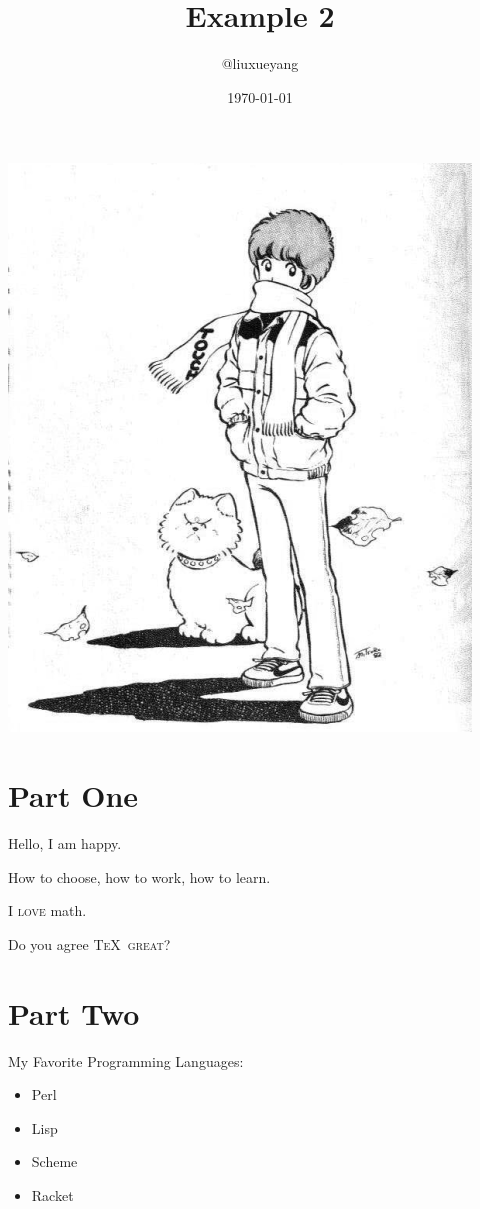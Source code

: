 \documentclass[a4paper, 11pt]{article}
\newcommand{\TUG}{\textsc{\TeX\ great}\xspace}
\begin{document}
\title{Example 2}
\author{@liuxueyang}
\date{\today}

\maketitle

\begin{center}
\includegraphics[scale=0.3]{kas.png}
\end{center}

\section{Part One}

Hello, I am happy.

How to choose, how to work, how to learn.

I \textsc{love} math.

Do you agree \TUG ?

\section{Part Two}

My Favorite Programming Languages:
\begin{itemize}
\item Perl
\item Lisp
\item Scheme
\item Racket
\end{itemize}
\end{document}
